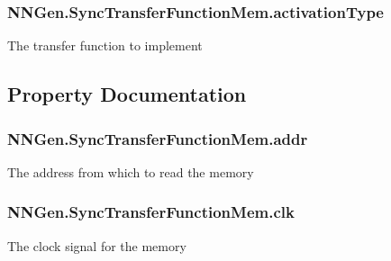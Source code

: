 \subsubsection[{activation\+Type}]{ N\+N\+Gen.\+Sync\+Transfer\+Function\+Mem.\+activation\+Type}\label{class_n_n_gen_1_1_sync_transfer_function_mem_a98b2591ff8d7243cfc7546a7c37032d7}


The transfer function to implement 



\subsection{Property Documentation}
\hypertarget{class_n_n_gen_1_1_sync_transfer_function_mem_a842f5ef77e0b13f7e5a91b69fb10880b}{}
\subsubsection[{addr}]{ N\+N\+Gen.\+Sync\+Transfer\+Function\+Mem.\+addr\hspace{0.3cm}{\ttfamily [get]}}\label{class_n_n_gen_1_1_sync_transfer_function_mem_a842f5ef77e0b13f7e5a91b69fb10880b}


The address from which to read the memory 

\hypertarget{class_n_n_gen_1_1_sync_transfer_function_mem_a39eac2d524a3ed0d3e55762373f3879c}{}
\subsubsection[{clk}]{ N\+N\+Gen.\+Sync\+Transfer\+Function\+Mem.\+clk\hspace{0.3cm}{\ttfamily [get]}}\label{class_n_n_gen_1_1_sync_transfer_function_mem_a39eac2d524a3ed0d3e55762373f3879c}


The clock signal for the memory 

\hypertarget{class_n_n_gen_1_1_sync_transfer_function_mem_a1afdcfbaa9233adc7673c2a59724accb}{}
